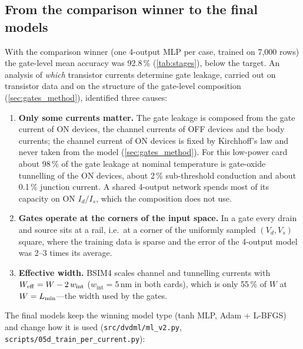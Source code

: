 \subsection{From the comparison winner to the final models}\label{sec:final_models}
With the comparison winner (one 4-output MLP per case, trained on 7{,}000 rows) the gate-level mean accuracy was 92.8\,\% (\cref{tab:stages}),
below the target. An analysis of \emph{which} transistor currents determine gate leakage, carried out on transistor data and on the structure of
the gate-level composition (\cref{sec:gates_method}), identified three causes:
\begin{enumerate}
  \item \textbf{Only some currents matter.} The gate leakage is composed from the gate current of ON devices, the channel currents of OFF devices and
        the body currents; the channel current of ON devices is fixed by Kirchhoff's law and never taken from the model (\cref{sec:gates_method}).
        For this low-power card about 98\,\% of the gate leakage at nominal temperature is gate-oxide tunnelling of the ON devices, about 2\,\%
        sub-threshold conduction and about 0.1\,\% junction current. A shared 4-output network spends most of its capacity on ON $I_d/I_s$, which
        the composition does not use.
  \item \textbf{Gates operate at the corners of the input space.} In a gate every drain and source sits at a rail, i.e.\ at a corner of the uniformly
        sampled $(V_d,V_s)$ square, where the training data is sparse and the error of the 4-output model was 2--3 times its average.
  \item \textbf{Effective width.} BSIM4 scales channel and tunnelling currents with $W_{\mathrm{eff}}=W-2\,w_{\mathrm{int}}$ ($w_{\mathrm{int}}=5\,\mathrm{nm}$ in
        both cards), which is only 55\,\% of $W$ at $W=L_{\min}$---the width used by the gates.
\end{enumerate}
The final models keep the winning model type (tanh MLP, Adam + L-BFGS) and change how it is used (\texttt{src/dvdml/ml\_v2.py},
\texttt{scripts/05d\_train\_per\_current.py}):
